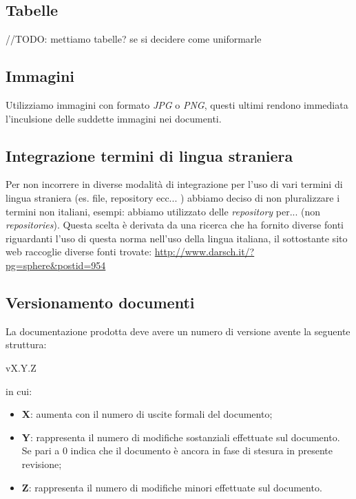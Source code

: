 \subsection{Tabelle}
//TODO: mettiamo tabelle? se si decidere come uniformarle

\subsection{Immagini}
Utilizziamo immagini con formato \textit{JPG} o \textit{PNG}, questi ultimi rendono immediata l'inculsione delle suddette immagini nei documenti.

\subsection{Integrazione termini di lingua straniera}
Per non incorrere in diverse modalità di integrazione per l'uso di vari termini di lingua straniera (es. file, repository ecc... ) abbiamo deciso di non pluralizzare i termini non italiani, esempi:
abbiamo utilizzato delle \textit{repository} per... (non \textit{repositories}).
Questa scelta è derivata da una ricerca che ha fornito diverse fonti riguardanti l'uso di questa norma nell'uso della lingua italiana, il sottostante sito web raccoglie diverse fonti trovate:
\url{http://www.darsch.it/?pg=sphere&postid=954}

\subsection{Versionamento documenti}
La documentazione prodotta deve avere un numero di versione avente la seguente struttura:
\begin{center}
vX.Y.Z
\end{center}
in cui:
\begin{itemize}
\item \textbf{X}: aumenta con il numero di uscite formali del documento;
\item \textbf{Y}: rappresenta il numero di modifiche sostanziali effettuate sul documento. Se pari a 0 indica che il documento è ancora in fase di stesura in presente revisione;
\item \textbf{Z}: rappresenta il numero di modifiche minori effettuate sul documento.  
\end{itemize}

